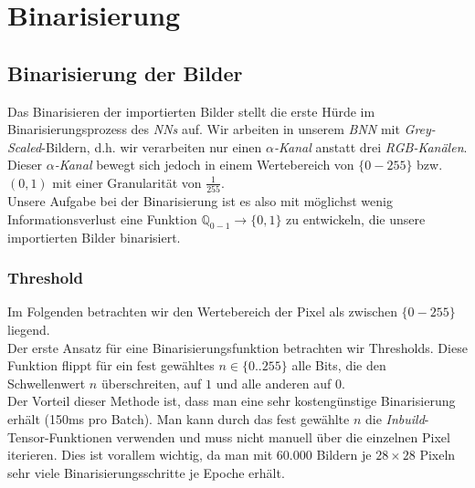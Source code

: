 \chapter{Binarisierung}
\section{Binarisierung der Bilder}
Das Binarisieren der importierten Bilder stellt die erste Hürde im Binarisierungsprozess des \textit{NNs} auf. Wir arbeiten in unserem \textit{BNN} mit \textit{Grey-Scaled}-Bildern, d.h. wir verarbeiten nur einen $\alpha$\textit{-Kanal} anstatt drei \textit{RGB-Kanälen}. Dieser $\alpha$\textit{-Kanal} bewegt sich jedoch in einem Wertebereich von $\{0-255\}$ bzw. $(0,1)$ mit einer Granularität von $\frac{1}{255}$.\\

Unsere Aufgabe bei der Binarisierung ist es also mit möglichst wenig Informationsverlust eine Funktion $\mathbb{Q}_{0-1} \rightarrow \{0,1\}$ zu entwickeln, die unsere importierten Bilder binarisiert.

\subsection{Threshold}

Im Folgenden betrachten wir den Wertebereich der Pixel als zwischen $\{0-255\}$ liegend.\\Der erste Ansatz für eine Binarisierungsfunktion betrachten wir Thresholds. Diese Funktion flippt für ein fest gewähltes $n \in \{0..255\}$ alle Bits, die den Schwellenwert $n$ überschreiten, auf $1$ und alle anderen auf $0$.\\

Der Vorteil dieser Methode ist, dass man eine sehr kostengünstige Binarisierung erhält (150ms pro Batch). Man kann durch das fest gewählte $n$ die \textit{Inbuild}-Tensor-Funktionen verwenden und muss nicht manuell über die einzelnen Pixel iterieren. Dies ist vorallem wichtig, da man mit $60.000$ Bildern je $28 \times 28$ Pixeln sehr viele Binarisierungsschritte je Epoche erhält.\\

